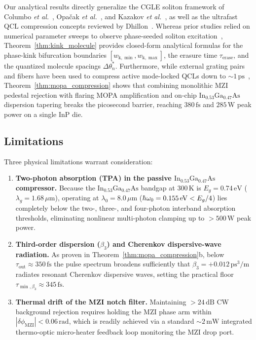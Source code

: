 \documentclass[11pt,letterpaper]{article}
\renewcommand{\hbar}{\mathchar'26\mkern-9mu h}
\begin{document}
Our analytical results directly generalize the CGLE soliton framework of Columbo \textit{et al.}~\cite{Columbo2021,ColumboRoadmap2025}, Opa\v{c}ak \textit{et al.}~\cite{Opa2024}, and Kazakov \textit{et al.}~\cite{Kazakov2025}, as well as the ultrafast QCL compression concepts reviewed by Dhillon~\cite{DhillonRoadmap2025}. Whereas prior studies relied on numerical parameter sweeps to observe phase-seeded soliton excitation~\cite{Kazakov2025,ColumboRoadmap2025}, Theorem~\ref{thm:kink_molecule} provides closed-form analytical formulas for the phase-kink bifurcation boundaries $[w_{\mathrm{k},\min}, w_{\mathrm{k},\max}]$, the erasure time $\tau_{\mathrm{erase}}$, and the quantized molecule spacings $\Delta\theta_n^*$. Furthermore, while external grating pairs and fibers have been used to compress active mode-locked QCLs down to $\sim 1\,\mathrm{ps}$~\cite{DhillonRoadmap2025}, Theorem~\ref{thm:mopa_compression} shows that combining monolithic MZI pedestal rejection with flaring MOPA amplification and on-chip $\mathrm{In}_{0.53}\mathrm{Ga}_{0.47}\mathrm{As}$ dispersion tapering breaks the picosecond barrier, reaching $380\,\mathrm{fs}$ and $285\,\mathrm{W}$ peak power on a single InP die.

\subsection{Limitations}
\label{subsec:limitations}

Three physical limitations warrant consideration:
\begin{enumerate}
    \item \textbf{Two-photon absorption (TPA) in the passive $\mathrm{In}_{0.53}\mathrm{Ga}_{0.47}\mathrm{As}$ compressor.} Because the $\mathrm{In}_{0.53}\mathrm{Ga}_{0.47}\mathrm{As}$ bandgap at $300\,\mathrm{K}$ is $E_g = 0.74\,\mathrm{eV}$ ($\lambda_g = 1.68\,\mu\mathrm{m}$), operating at $\lambda_0 = 8.0\,\mu\mathrm{m}$ ($\hbar\omega_0 = 0.155\,\mathrm{eV} < E_g/4$) lies completely below the two-, three-, and four-photon interband absorption thresholds, eliminating nonlinear multi-photon clamping up to $>500\,\mathrm{W}$ peak power.
    \item \textbf{Third-order dispersion ($\beta_3$) and Cherenkov dispersive-wave radiation.} As proven in Theorem~\ref{thm:mopa_compression}b, below $\tau_{\mathrm{out}} \approx 350\,\mathrm{fs}$ the pulse spectrum broadens sufficiently that $\beta_3 = +0.012\,\mathrm{ps^3/m}$ radiates resonant Cherenkov dispersive waves, setting the practical floor $\tau_{\min,\beta_3} \approx 345\,\mathrm{fs}$.
    \item \textbf{Thermal drift of the MZI notch filter.} Maintaining $>24\,\mathrm{dB}$ CW background rejection requires holding the MZI phase arm within $|\delta\phi_{\mathrm{MZI}}| < 0.06\,\mathrm{rad}$, which is readily achieved via a standard $\sim 2\,\mathrm{mW}$ integrated thermo-optic micro-heater feedback loop monitoring the MZI drop port.
\end{enumerate}
\end{document}
